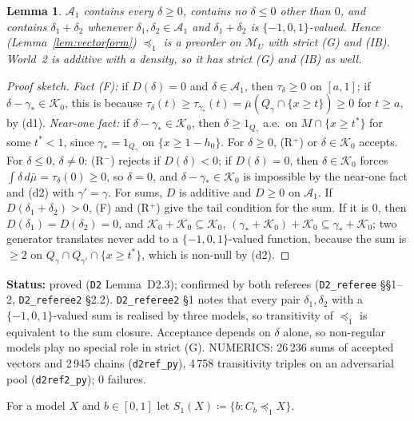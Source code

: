 \documentclass[11pt]{article}
\newtheorem{lemma}[theorem]{Lemma}
\theoremstyle{definition}
\theoremstyle{remark}
\newcommand{\M}{\mathcal M}
\newcommand{\src}[1]{\texttt{#1}}
\newcommand{\status}[1]{\par\smallskip\noindent\textbf{Status:} #1\par\smallskip}
\begin{document}
\begin{lemma}\label{lem:D23}
$\mathcal A_1$ contains every $\delta\ge0$, contains no $\delta\le0$ other than $0$, and contains $\delta_1+\delta_2$ whenever $\delta_1,\delta_2\in\mathcal A_1$ and $\delta_1+\delta_2$ is $\{-1,0,1\}$-valued. Hence (Lemma~\ref{lem:vectorform}) $\preceq_1$ is a preorder on $\M_U$ with strict (G) and (IB). World~2 is additive with a density, so it has strict (G) and (IB) as well.
\end{lemma}
\begin{proof}[Proof sketch]
\emph{Fact (F):} if $D(\delta)=0$ and $\delta\in\mathcal A_1$, then $\tau_\delta\ge0$ on $[a,1]$; if $\delta-\gamma_*\in\mathcal K_0$, this is because $\tau_\delta(t)\ge\tau_{\gamma_*}(t)=\bar\mu(Q_\gamma\cap\{x\ge t\})\ge0$ for $t\ge a$, by (d1). \emph{Near-one fact:} if $\delta-\gamma_*\in\mathcal K_0$, then $\delta\ge1_{Q_\gamma}$ a.e.\ on $M\cap\{x\ge t^*\}$ for some $t^*<1$, since $\gamma_*=1_{Q_\gamma}$ on $\{x\ge1-h_0\}$. For $\delta\ge0$, (R$^+$) or $\delta\in\mathcal K_0$ accepts. For $\delta\le0$, $\delta\ne0$: (R$^-$) rejects if $D(\delta)<0$; if $D(\delta)=0$, then $\delta\in\mathcal K_0$ forces $\int\delta\,d\bar\mu=\tau_\delta(0)\ge0$, so $\delta=0$, and $\delta-\gamma_*\in\mathcal K_0$ is impossible by the near-one fact and (d2) with $\gamma'=\gamma$. For sums, $D$ is additive and $D\ge0$ on $\mathcal A_1$. If $D(\delta_1+\delta_2)>0$, (F) and (R$^+$) give the tail condition for the sum. If it is $0$, then $D(\delta_1)=D(\delta_2)=0$, and $\mathcal K_0+\mathcal K_0\subseteq\mathcal K_0$, $(\gamma_*+\mathcal K_0)+\mathcal K_0\subseteq\gamma_*+\mathcal K_0$; two generator translates never add to a $\{-1,0,1\}$-valued function, because the sum is $\ge2$ on $Q_\gamma\cap Q_{\gamma'}\cap\{x\ge t^*\}$, which is non-null by (d2).
\end{proof}
\status{proved (\src{D2} Lemma~D2.3); confirmed by both referees (\src{D2\_referee} \S\S1--2, \src{D2\_referee2} \S2.2). \src{D2\_referee2} \S1 notes that every pair $\delta_1,\delta_2$ with a $\{-1,0,1\}$-valued sum is realised by three models, so transitivity of $\preceq_1$ is equivalent to the sum closure. Acceptance depends on $\delta$ alone, so non-regular models play no special role in strict (G). NUMERICS: 26\,236 sums of accepted vectors and 2\,945 chains (\src{d2ref\_py}), 4\,758 transitivity triples on an adversarial pool (\src{d2ref2\_py}); 0 failures.}

For a model $X$ and $b\in[0,1]$ let $S_1(X)\coloneqq\{b:C_b\preceq_1X\}$.
\end{document}
